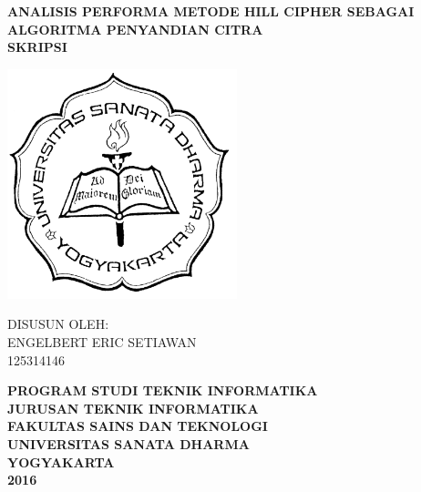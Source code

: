 \begin{titlepage}
\begin{center}
\onehalfspacing\large\bfseries
\textsc{ANALISIS PERFORMA METODE HILL CIPHER SEBAGAI ALGORITMA PENYANDIAN CITRA}\\
\vspace{18pt}
\normalsize SKRIPSI \\
\vspace{12pt}
\linespread{1.5}
	\vspace{12pt}
	
	\includegraphics[width=0.5\textwidth]{images/logo-usd.png}
	
	\vspace{12pt}
	DISUSUN OLEH: \\
	ENGELBERT ERIC SETIAWAN \\
	125314146
	
	\vfill
	\textbf{
	 PROGRAM STUDI TEKNIK INFORMATIKA \\
	 JURUSAN TEKNIK INFORMATIKA\\
	FAKULTAS SAINS DAN TEKNOLOGI \\
	UNIVERSITAS SANATA DHARMA \\
	YOGYAKARTA\\
	2016
	}
	

	
\end{center}

\end{titlepage}

\newpage
